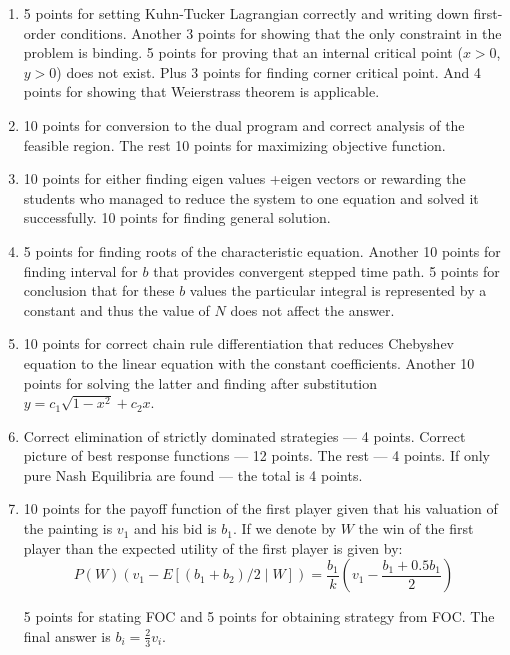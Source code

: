 \begin{enumerate}
\item 5 points for setting Kuhn-Tucker Lagrangian correctly and writing down first-order conditions. Another 3 points for showing that the only constraint in the problem is binding. 5 points for proving that an internal  critical point ($x>0$, $y>0$) does not exist. Plus 3 points for finding corner critical point. And 4 points for showing that Weierstrass theorem is applicable.

\item 10 points for conversion to the dual program and correct analysis of the feasible region. The rest 10 points for maximizing objective function.

\item 10 points for either finding eigen values +eigen vectors or rewarding the students who managed to reduce the system to one equation and solved it successfully. 10 points for finding general solution.

\item 5 points for finding roots of the characteristic equation. Another 10 points for finding interval for $b$ that provides convergent stepped time path. 5 points for conclusion that for these $b$ values the particular integral is represented by a constant and thus the value of   $N$ does not affect the answer.

\item 10 points for correct chain rule differentiation that reduces Chebyshev equation to the linear equation with the constant coefficients. Another 10 points for solving the latter and finding  after substitution $y=c_1 \sqrt{1-x^2}+c_2 x$.

\item Correct elimination of strictly dominated strategies --- 4 points. Correct picture of best response functions --- 12 points. The rest --- 4 points.  If only pure Nash Equilibria are found --- the total is 4 points.

\item 10 points for the payoff function of the first player given that his valuation of the painting is $v_1$ and his bid is $b_1$. If we denote by $W$ the win of the first player than the expected utility of the first player is given by:
\[
P(W) \left( v_1 - E[(b_1+b_2)/2 \mid W] \right) = \frac{b_1}{k} \left( v_1 - \frac{b_1+0.5b_1}{2}\right)
\]

5 points for stating FOC and 5 points for obtaining strategy from FOC. The final answer is $b_i=\frac{2}{3}v_i$.

\end{enumerate}



